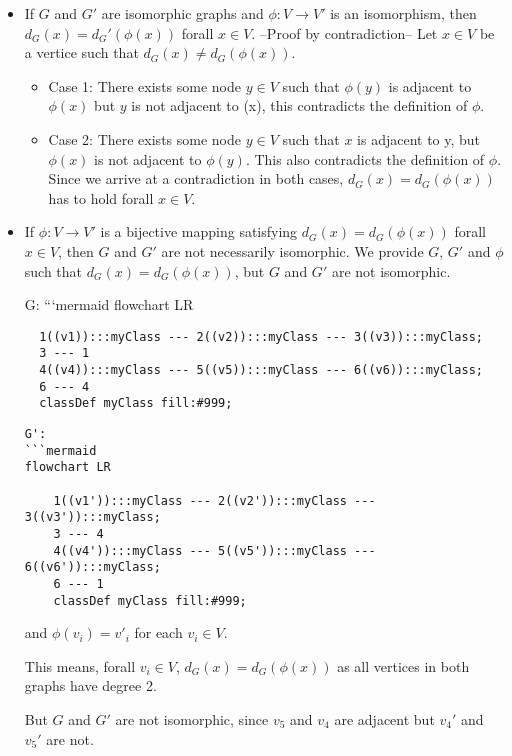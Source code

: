 \documentclass[
]{article}
\providecommand{\tightlist}{%
  \setlength{\itemsep}{0pt}\setlength{\parskip}{0pt}}
\begin{document}
\begin{itemize}
\item
  If \(G\) and \(G'\) are isomorphic graphs and
  \(\phi : V \rightarrow V'\) is an isomorphism, then
  \(d_G(x) = d_G'(\phi(x))\) forall \(x \in V\). --Proof by
  contradiction-- Let \(x \in V\) be a vertice such that
  \(d_G(x) \neq d_G(\phi(x))\).

  \begin{itemize}
  \tightlist
  \item
    Case 1: There exists some node \(y \in V\) such that \(\phi(y)\) is
    adjacent to \(\phi(x)\) but \(y\) is not adjacent to (x), this
    contradicts the definition of \(\phi\).
  \item
    Case 2: There exists some node \(y \in V\) such that \(x\) is
    adjacent to y, but \(\phi(x)\) is not adjacent to \(\phi(y)\). This
    also contradicts the definition of \(\phi\). Since we arrive at a
    contradiction in both cases, \(d_G(x) = d_G(\phi(x))\) has to hold
    forall \(x \in V\).
  \end{itemize}
\item
  If \(\phi : V \rightarrow V'\) is a bijective mapping satisfying
  \(d_G(x) = d_G(\phi(x))\) forall \(x \in V\), then \(G\) and \(G'\)
  are not necessarily isomorphic. We provide \(G\), \(G'\) and \(\phi\)
  such that \(d_G(x) = d_G(\phi(x))\), but \(G\) and \(G'\) are not
  isomorphic.

  G: ```mermaid flowchart LR

\begin{verbatim}
  1((v1)):::myClass --- 2((v2)):::myClass --- 3((v3)):::myClass;
  3 --- 1
  4((v4)):::myClass --- 5((v5)):::myClass --- 6((v6)):::myClass;
  6 --- 4
  classDef myClass fill:#999; 
\end{verbatim}

\begin{verbatim}
G':
```mermaid
flowchart LR

    1((v1')):::myClass --- 2((v2')):::myClass --- 3((v3')):::myClass;
    3 --- 4
    4((v4')):::myClass --- 5((v5')):::myClass --- 6((v6')):::myClass;
    6 --- 1
    classDef myClass fill:#999; 
\end{verbatim}

  and \(\phi(v_i) = v'_i\) for each \(v_i \in V\).

  This means, forall \(v_i \in V\), \(d_G(x) = d_G(\phi(x))\) as all
  vertices in both graphs have degree 2.

  But \(G\) and \(G'\) are not isomorphic, since \(v_5\) and \(v_4\) are
  adjacent but \(v_4'\) and \(v_5'\) are not.
\end{itemize}
\end{document}
